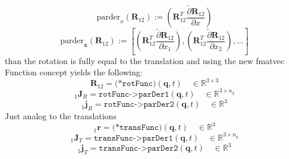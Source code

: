 \documentclass{report}
\newcommand{\bs}[1]{\boldsymbol #1}
\begin{document}
\begin{equation}
\text{parder}_x(\bs{R}_{12}):=\widetilde{\left(\bs{R}_{12}^T\frac{\partial\bs{R}_{12}}{\partial x}\right)}
\end{equation}
\begin{equation}
\text{parder}_{\bs{x}}(\bs{R}_{12}):=\left[\widetilde{\left(\bs{R}_{12}^T\frac{\partial\bs{R}_{12}}{\partial x_1}\right)},\widetilde{\left(\bs{R}_{12}^T\frac{\partial\bs{R}_{12}}{\partial x_2}\right)},\dots\right]
\end{equation}
than the rotation is fully equal to the translation and using the new fmatvec Function concept yields the following:
\begin{equation}
\bs{R}_{12}=\texttt{(*rotFunc)}(\bs{q},t)\quad\in\mathbb{R}^{3\times 3}
\end{equation}
\begin{equation}
_1\bs{J}_R=\texttt{rotFunc->parDer1}(\bs{q},t)\quad\in\mathbb{R}^{3\times n_q}
\end{equation}
\begin{equation}
_1\bs{j}_R=\texttt{rotFunc->parDer2}(\bs{q},t)\quad\in\mathbb{R}^3
\end{equation}
Just analog to the translations
\begin{equation}
_1\bs{r}=\texttt{(*transFunc)}(\bs{q},t)\quad\in\mathbb{R}^3
\end{equation}
\begin{equation}
_1\bs{J}_T=\texttt{transFunc->parDer1}(\bs{q},t)\quad\in\mathbb{R}^{3\times n_q}
\end{equation}
\begin{equation}
_1\bs{j}_T=\texttt{transFunc->parDer2}(\bs{q},t)\quad\in\mathbb{R}^3
\end{equation}
\end{document}
